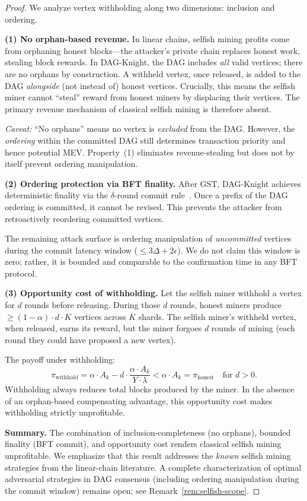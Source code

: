 \documentclass[11pt,a4paper]{article}
\theoremstyle{definition}
\theoremstyle{remark}
\newcommand{\DK}{\textsf{DAG-Knight}}
\newcommand{\GST}{\mathrm{GST}}
\newcommand{\payoff}{\pi}
\newcommand{\blockrate}{\lambda}
\begin{document}
\begin{proof}
We analyze vertex withholding along two dimensions: inclusion and
ordering.

\textbf{(1) No orphan-based revenue.}
In linear chains, selfish mining profits come from orphaning honest
blocks---the attacker's private chain replaces honest work, stealing
block rewards.
In \DK{}, the DAG includes \emph{all} valid vertices; there are no
orphans by construction.
A withheld vertex, once released, is added to the DAG \emph{alongside}
(not instead of) honest vertices.
Crucially, this means the selfish miner cannot ``steal'' reward from
honest miners by displacing their vertices.
The primary revenue mechanism of classical selfish mining is therefore
absent.

\emph{Caveat:} ``No orphans'' means no vertex is \emph{excluded} from
the DAG.
However, the \emph{ordering} within the committed DAG still determines
transaction priority and hence potential MEV.
Property~(1) eliminates revenue-stealing but does not by itself prevent
ordering manipulation.

\textbf{(2) Ordering protection via BFT finality.}
After $\GST$, \DK{} achieves deterministic finality via the
$\delta$-round commit rule~\cite{dagknight-safety}.
Once a prefix of the DAG ordering is committed, it cannot be revised.
This prevents the attacker from retroactively reordering committed
vertices.

The remaining attack surface is ordering manipulation of
\emph{uncommitted} vertices during the commit latency window
($\leq 3\Delta + 2\epsilon$).
We do not claim this window is zero; rather, it is bounded and
comparable to the confirmation time in any BFT protocol.

\textbf{(3) Opportunity cost of withholding.}
Let the selfish miner withhold a vertex for $d$ rounds before releasing.
During those $d$ rounds, honest miners produce
$\geq (1-\alpha) \cdot d \cdot K$ vertices across $K$ shards.
The selfish miner's withheld vertex, when released, earns its reward,
but the miner forgoes $d$ rounds of mining (each round they could have
proposed a new vertex).

The payoff under withholding:
\[
  \payoff_{\text{withhold}} = \alpha \cdot A_k - d \cdot
  \frac{\alpha \cdot A_k}{Y \cdot \blockrate} < \alpha \cdot A_k
  = \payoff_{\text{honest}} \quad \text{for } d > 0.
\]
Withholding always reduces total blocks produced by the miner.
In the absence of an orphan-based compensating advantage, this
opportunity cost makes withholding strictly unprofitable.

\textbf{Summary.}
The combination of inclusion-completeness (no orphans), bounded
finality (BFT commit), and opportunity cost renders classical selfish
mining unprofitable.
We emphasize that this result addresses the \emph{known} selfish mining
strategies from the linear-chain literature.
A complete characterization of optimal adversarial strategies in DAG
consensus (including ordering manipulation during the commit window)
remains open; see Remark~\ref{rem:selfish-scope}.
\end{proof}
\end{document}
